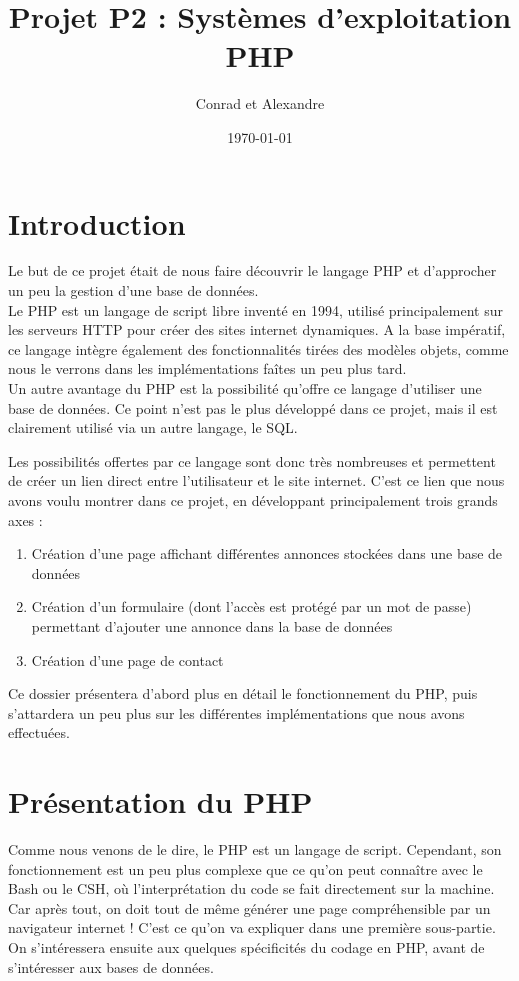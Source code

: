 \documentclass{article}
\author{Conrad \bsc{Hillairet} et Alexandre \bsc{Vieira}}
\title{Projet P2 : Systèmes d'exploitation \\ \Large{PHP}}
\date{\today}
\begin{document}
\maketitle

\setcounter{tocdepth}{4}
\tableofcontents
\newpage

\section*{Introduction}
Le but de ce projet était de nous faire découvrir le langage PHP et d'approcher un peu la gestion d'une base de données. \\
Le PHP est un langage de script libre inventé en 1994, utilisé principalement sur les serveurs HTTP pour créer des sites internet dynamiques. A la base impératif, ce langage intègre également des fonctionnalités tirées des modèles objets, comme nous le verrons dans les implémentations faîtes un peu plus tard. \\
Un autre avantage du PHP est la possibilité qu'offre ce langage d'utiliser une base de données. Ce point n'est pas le plus développé dans ce projet, mais il est clairement utilisé via un autre langage, le SQL.

\bigskip
Les possibilités offertes par ce langage sont donc très nombreuses et permettent de créer un lien direct entre l'utilisateur et le site internet. C'est ce lien que nous avons voulu montrer dans ce projet, en développant principalement trois grands axes :
\begin{enumerate}
	\item Création d'une page affichant différentes annonces stockées dans une base de données
	\item Création d'un formulaire (dont l'accès est protégé par un mot de passe) permettant d'ajouter une annonce dans la base de données
	\item Création d'une page de contact
\end{enumerate}
Ce dossier présentera d'abord plus en détail le fonctionnement du PHP, puis s'attardera un peu plus sur les différentes implémentations que nous avons effectuées. 

\newpage
\section{Présentation du PHP}
Comme nous venons de le dire, le PHP est un langage de script. Cependant, son fonctionnement est un peu plus complexe que ce qu'on peut connaître avec le Bash ou le CSH, où l'interprétation du code se fait directement sur la machine.
Car après tout, on doit tout de même générer une page compréhensible par un navigateur internet ! C'est ce qu'on va expliquer dans une première sous-partie. On s'intéressera ensuite aux quelques spécificités du codage en PHP, avant de s'intéresser aux bases de données.
\end{document}
